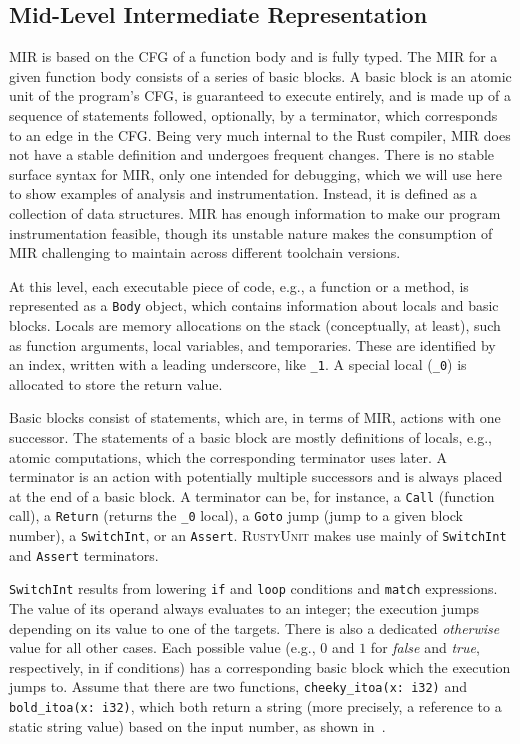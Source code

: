 \documentclass[paper=a4,%
  twoside,%
  BCOR4mm,%
  abstract=true,%
  toc=bibliography,%
  chapterprefix=true,%
  toc=bibliographynumbered,%
  open=right,%
  english,%
  pagesize=pdftex]{scrreprt}
\newcommand{\tech}{\textsc{RustyUnit}\xspace}
\newcommand{\mir}{\ac{MIR}\xspace}
\newcommand{\cfg}{\ac{CFG}\xspace}
\begin{document}
\subsection{Mid-Level Intermediate Representation}
\mir is based on the \cfg of a function body and is fully typed. The \mir for a given function body consists of a series of basic blocks. A basic block is an atomic unit of the program's \cfg, is guaranteed to execute entirely, and is made up of a sequence of statements followed, optionally, by a terminator, which corresponds to an edge in the \cfg. Being very much internal to the Rust compiler, \mir does not have a stable definition and undergoes frequent changes. There is no stable surface syntax for \mir, only one intended for debugging, which we will use here to show examples of analysis and instrumentation. Instead, it is defined as a collection of data structures. \mir has enough information to make our program instrumentation feasible, though its unstable nature makes the consumption of \mir challenging to maintain across different toolchain versions.

At this level, each executable piece of code, e.g., a function or a method, is represented as a \texttt{Body} object, which contains information about locals and basic blocks. Locals are memory allocations on the stack (conceptually, at least), such as function arguments, local variables, and temporaries. These are identified by an index, written with a leading underscore, like \texttt{\string_1}. A special local (\texttt{\string_0}) is allocated to store the return value.

Basic blocks consist of statements, which are, in terms of \mir, actions with one successor. The statements of a basic block are mostly definitions of locals, e.g., atomic computations, which the corresponding terminator uses later. A terminator is an action with potentially multiple successors and is always placed at the end of a basic block. A terminator can be, for instance, a \texttt{Call} (function call), a \texttt{Return} (returns the \texttt{\string_0} local), a \texttt{Goto} jump (jump to a given block number), a \texttt{SwitchInt}, or an \texttt{Assert}. \tech makes use mainly of \texttt{SwitchInt} and \texttt{Assert} terminators.

\texttt{SwitchInt} results from lowering \texttt{if} and \texttt{loop} conditions and \texttt{match} expressions. The value of its operand always evaluates to an integer; the execution jumps depending on its value to one of the targets. There is also a dedicated \emph{otherwise} value for all other cases. Each possible value (e.g., $0$ and $1$ for \emph{false} and \emph{true}, respectively, in if conditions) has a corresponding basic block which the execution jumps to. Assume that there are two functions, \texttt{cheeky\string_itoa(x: i32)} and \texttt{bold\string_itoa(x: i32)}, which both return a string (more precisely, a reference to a static string value) based on the input number, as shown in~.
\end{document}
